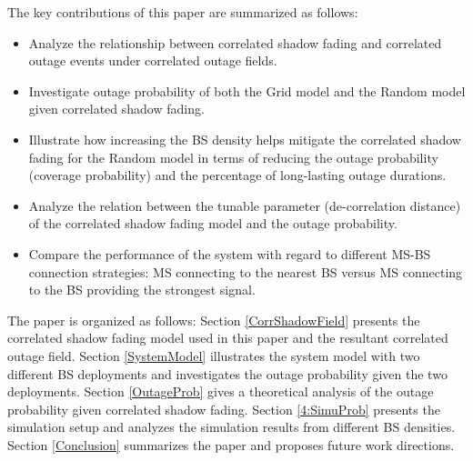 \documentclass[journal,10pt]{IEEEtran}
\begin{document}
 \par The key contributions of this paper are summarized as follows:
 \begin{itemize}
 \item Analyze the relationship between correlated shadow fading and correlated outage events under correlated outage fields.
 \item Investigate outage probability of both the Grid model and the Random model given correlated shadow fading.
 \item Illustrate how increasing the BS density helps mitigate the correlated shadow fading for the Random model in terms of reducing the outage probability (coverage probability) and the percentage of long-lasting outage durations.
 \item Analyze the relation between the tunable parameter (de-correlation distance) of the correlated shadow fading model and the outage probability.
 \item Compare the performance of the system with regard to different MS-BS connection strategies: MS connecting to the nearest BS versus MS connecting to the BS providing the strongest signal.
 \end{itemize}
 The paper is organized as follows: Section \ref{CorrShadowField} presents the correlated shadow fading model used in this paper and the resultant correlated outage field. Section \ref{SystemModel} illustrates the system model with two different BS deployments and investigates the outage probability given the two deployments. Section \ref{OutageProb} gives a theoretical analysis of the outage probability given correlated shadow fading. Section \ref{4:SimuProb} presents the simulation setup and analyzes the simulation results from different BS densities. Section \ref{Conclusion} summarizes the paper and proposes future work directions.
\end{document}
